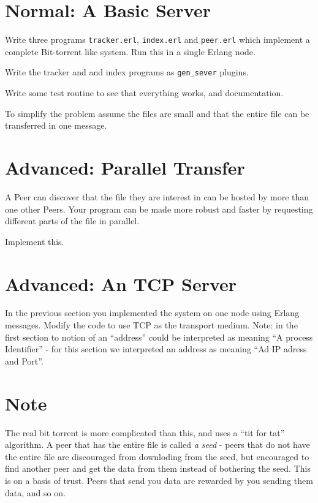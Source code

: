 \documentclass[12pt]{hitec}
\begin{document}
\section{Normal: A Basic Server}

Write three programs \verb+tracker.erl+, \verb+index.erl+ and \verb+peer.erl+
which implement a complete Bit-torrent like system. Run this in a single Erlang node.

Write the tracker and and index programs as \verb+gen_sever+ plugins.

Write some test routine to see that everything works, and documentation.

To simplify the problem assume the files are small and that the entire file
can be transferred in one message.

\section{Advanced: Parallel Transfer}

A Peer can discover that the file they are interest in can be hosted
by more than one other Peers. Your program can be made more robust and
faster by requesting different parts of the file in parallel.

Implement this.

\section{Advanced: An TCP Server}

In the previous section you implemented the system on one node using
Erlang messages.  Modify the code to use TCP as the transport
medium. Note: in the first section to notion of an ``address'' could
be interpreted as meaning ``A process Identifier'' - for this section
we interpreted an address as meaning ``Ad IP adress and Port''.


\section*{Note}

The real bit torrent is more complicated than this, and uses a ``tit
for tat'' algorithm.  A peer that has the entire file is called {\sl a
  seed} - peers that do not have the entire file are discouraged from
downloding from the seed, but encouraged to find another peer and get
the data from them instead of bothering the seed. This is on a basis
of trust. Peers that send you data are rewarded by you sending them
data, and so on.
\end{document}
